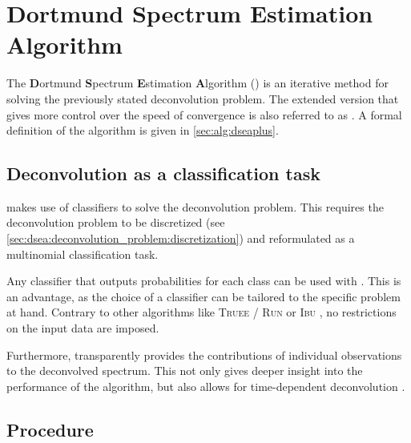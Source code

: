\section{Dortmund Spectrum Estimation Algorithm} \label{sec:dsea:dsea}
The \textbf{D}ortmund \textbf{S}pectrum \textbf{E}stimation \textbf{A}lgorithm
  (\dsea{})
  \cite{dsea_unification}
is an iterative method for solving the previously stated deconvolution problem.
The extended version \cite{dsea_mirko}
  that
    gives more control over the speed of convergence
is also referred to as \dseaplus{}.
%
A formal definition of the \dseaplus{} algorithm is given in \autoref{sec:alg:dseaplus}.


\subsection{Deconvolution as a classification task} %
\dsea{} makes use of classifiers to solve the deconvolution problem.
This requires the deconvolution problem to be
  discretized (see \autoref{sec:dsea:deconvolution_problem:discretization})
  and reformulated as a multinomial classification task.

Any classifier that outputs probabilities for each class
  can be used with \dsea{}.
This is an advantage,
  as the choice of a classifier can be tailored to the specific problem at hand.
Contrary to other algorithms like
  \textsc{Truee} / \textsc{Run} \cite{milke2013} or
  \textsc{Ibu} \cite{dagostini1995, dagostini2010},
no restrictions on the input data are imposed.

Furthermore,
\dsea{} transparently provides the contributions of individual observations to the deconvolved spectrum.
This not only gives deeper insight into the performance of the algorithm,
but also allows for time-dependent deconvolution \cite{dsea_mirko}. %


\clearpage %
\subsection{Procedure}



